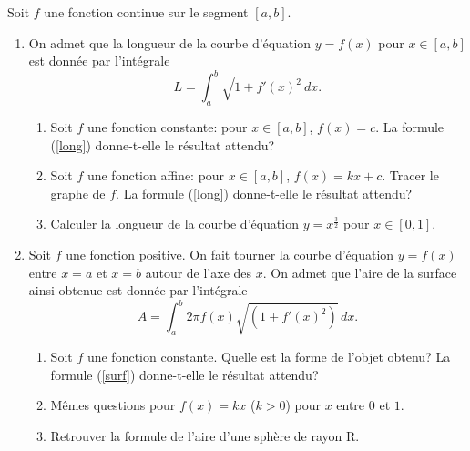\begin{exo}
    Soit $f$ une fonction continue sur le segment $[a,b]$.
    \begin{enumerate}
        \item On admet que la longueur de la courbe d'équation $y=f(x)$ pour $x \in [a,b]$ est donnée par l'intégrale
        \begin{equation}
            L=\int_{a}^{b} \sqrt{1+f'(x)^{2}}\,dx. \label{long}
        \end{equation}
        \begin{enumerate}
            \item Soit $f$ une fonction constante: pour $x\in[a,b]$, $f(x)=c$. La formule (\ref{long}) donne-t-elle le résultat attendu?
            \item Soit $f$ une fonction affine: pour $x\in[a,b]$, $f(x)=kx+c$. Tracer le graphe de $f$. La formule (\ref{long}) donne-t-elle le résultat attendu?
            \item Calculer la longueur de la courbe d'équation $y=x^{\frac{3}{2}}$ pour $x \in [0,1]$.
        \end{enumerate}
        \item  Soit $f$ une fonction positive. On fait tourner la courbe d'équation $y=f(x)$ entre $x=a$ et $x=b$ autour de l'axe des $x$. On admet que l'aire de la surface ainsi obtenue est donnée par l'intégrale
        \begin{equation}
            A=\int_a ^b 2\pi f(x) \sqrt {(1+f'(x) ^2)}\,dx. \label{surf}
        \end{equation}
        \begin{enumerate}
            \item Soit $f$ une fonction constante. Quelle est la forme de l'objet obtenu? La formule (\ref{surf}) donne-t-elle le résultat attendu?
            \item Mêmes questions pour $f(x)= kx$ ($k > 0$) pour $x$ entre $0$ et $1$.
            \item Retrouver la formule de l'aire d'une sphère de rayon R.
        \end{enumerate}
    \end{enumerate}
\end{exo}

